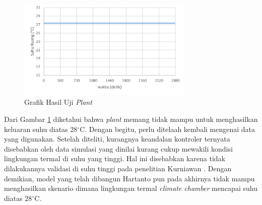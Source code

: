 \begin{figure}[!h]
	\centering
	\includegraphics[width=0.75\textwidth]{figures/UjiPlant}
	\caption{Grafik Hasil Uji \textit{Plant}}
	\label{fig:5:UjiPlant}
\end{figure}
\vspace{1em}

Dari Gambar \ref{fig:5:UjiPlant} diketahui bahwa \textit{plant} memang tidak mampu untuk menghasilkan keluaran suhu diatas 28$^\circ$C. Dengan begitu, perlu ditelaah kembali mengenai data yang digunakan. Setelah diteliti, kurangnya keandalan kontroler ternyata disebabkan oleh data simulasi yang dinilai kurang cukup mewakili kondisi lingkungan termal di suhu yang tinggi. Hal ini disebabkan karena tidak dilakukannya validasi di suhu tinggi pada penelitian Kurniawan \cite{skripsiIchfan}. Dengan demikian, model yang telah dibangun Hartanto pun pada akhirnya tidak mampu menghasilkan skenario dimana lingkungan termal \textit{climate chamber} mencapai suhu diatas 28$^\circ$C.